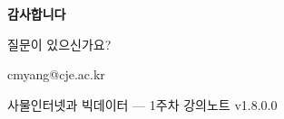 \documentclass[aspectratio=169, 11pt]{beamer}
\begin{document}

\begin{frame}{}
\begin{center}
\vspace{1cm}

{\Huge\bfseries\color{MainBlue} 감사합니다}

\vspace{1.5cm}

{\large 질문이 있으신가요?}

\vspace{0.8cm}

{\small cmyang@cje.ac.kr}

\vspace{1cm}

{\footnotesize 사물인터넷과 빅데이터 --- 1주차 강의노트 v1.8.0.0}

\end{center}
\end{frame}
\end{document}
